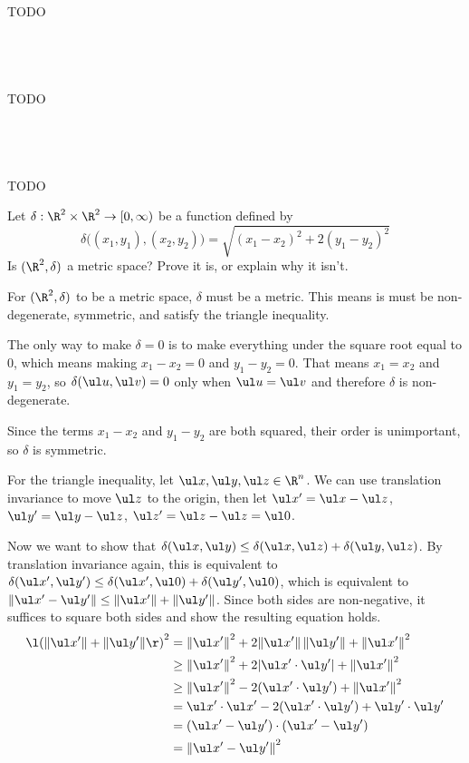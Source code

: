\documentclass[a4paper]{article}
\begin{document}
TODO

\subsection{~} %

TODO

\subsection{~} %

TODO



\begin{questionbody}
Let $\delta : \R^2 \times \R^2 \to [0, \infty)$ be a function defined by \[ %
\delta\big( (x_1, y_1), (x_2, y_2) \big) = \sqrt{{(x_1 - x_2)}^2 + 2{(y_1 - y_2)}^2}
\] Is $(\R^2, \delta)$ a metric space? Prove it is, or explain why it isn't.
\end{questionbody}

For $(\R^2, \delta)$ to be a metric space, $\delta$ must be a metric. This means is must be non-degenerate, symmetric, and satisfy the triangle inequality.

The only way to make $\delta = 0$ is to make everything under the square root equal to 0, which means making $x_1 - x_2 = 0$ and $y_1 - y_2 = 0$. That means $x_1 = x_2$ and $y_1 = y_2$, so $\delta(\ul u, \ul v) = 0$ only when $\ul u = \ul v$ and therefore $\delta$ is non-degenerate.

Since the terms $x_1 - x_2$ and $y_1 - y_2$ are both squared, their order is unimportant, so $\delta$ is symmetric.

For the triangle inequality, let $\ul x, \ul y, \ul z \in \R^n$. We can use translation invariance to move $\ul z$ to the origin, then let $\ul x' = \ul x - \ul z$, $\ul y' = \ul y - \ul z$, $\ul z' = \ul z - \ul z = \ul 0$.

Now we want to show that $\delta(\ul x, \ul y) \le \delta(\ul x, \ul z) + \delta(\ul y, \ul z)$. By translation invariance again, this is equivalent to $\delta(\ul x', \ul y') \le \delta(\ul x', \ul 0) + \delta(\ul y', \ul 0)$, which is equivalent to $\| \ul x' - \ul y' \| \le \| \ul x' \| + \| \ul y' \|$. Since both sides are non-negative, it suffices to square both sides and show the resulting equation holds.
\begin{align*}
{\l( \| \ul x' \| + \| \ul y' \| \r)}^2 &=
  {\| \ul x' \|}^2 + 2 {\| \ul x' \|} \, {\| \ul y' \|} + {\| \ul x' \|}^2 \\
&\ge {\| \ul x' \|}^2 + 2 {| \ul x' \cdot \ul y' |} + {\| \ul x' \|}^2 \\
&\ge {\| \ul x' \|}^2 - 2 (\ul x' \cdot \ul y') + {\| \ul x' \|}^2 \\
&= \ul x' \cdot \ul x' - 2 (\ul x' \cdot \ul y') + \ul y' \cdot \ul y' \\
&= (\ul x' - \ul y') \cdot (\ul x' - \ul y') \\
&= {\| \ul x' - \ul y' \|}^2
\end{align*}
\end{document}
